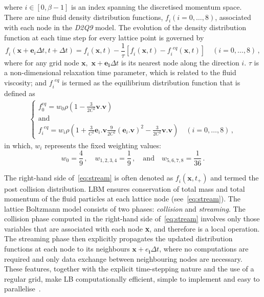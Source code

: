 %
\noindent where $\mathit{i} \in [0, \beta -1]$ is an index spanning the 
discretised momentum space. There are nine fluid density distribution 
functions, $\mathit{f_i}(\mathit{i}=0,\dots,8)$, associated with each node 
in the \textit{D2Q9} model. The evolution of the density distribution function 
at each time step for every lattice point is governed by
%
\begin{equation} 
	\label{eq:stream}
	\mathit{f_i}(\mathbf{x}+\mathbf{e}_{\mathit{i}} \Delta t, t + \Delta t) = 
	\mathit{f_i}(\mathbf{x},t) - \frac{1}{\tau} [\mathit{f_i}(\mathbf{x},t) 
	-\mathit{f_i}^{\mathit{eq}}(\mathbf{x},t)] \quad (\mathit{i}=0,\dots,8) \,,
\end{equation}
%
\noindent where for any grid node $\mathbf{x},$ $\mathbf{x}+\mathbf{e_i} \Delta 
t$ 
is its nearest node along the direction $\mathit{i}$. $\tau$ is a 
non-dimensional relaxation time parameter, which is related to the fluid 
viscosity; and $\mathit{f_i}^{\mathit{eq}}$ is termed as the equilibrium 
distribution function that is defined as
%
\begin{align}
	\begin{cases}
	\mathit{f}_{\mathit{0}}^{\mathit{eq}} = \mathit{w}_{\mathit{0}} \rho (1 - 
	\frac{3}{2\mathit{C}^{\mathit{2}}}\mathbf{v}.\mathbf{v}) \\ 
	\mbox{and}\\
	\mathit{f_i}^{\mathit{eq}} = \mathit{w_i} \rho (1 + 
	\frac{3}{\mathit{C}^{\mathit{2}}}\mathbf{e}_{\mathit{i}}.\mathbf{v} 
	\frac{9}{2\mathit{C}^{\mathit{2}}} 
	(\mathbf{e}_{\mathit{i}}.\mathbf{v})^{\mathit{2}}-\frac{3}{2 
	\mathit{C}^{\mathit{2}}}\mathbf{v}.\mathbf{v}) \quad 
	(\mathit{i}=0,\dots,8)\,,
	\end{cases}
\end{align}
%
\noindent in which, $\mathit{w_i}$ represents the fixed weighting values:
%
\begin{equation}
	\mathit{w}_{\mathit{0}} = \frac{4}{9}\,, \quad 
	\mathit{w}_{\mathit{1,2,3,4}}= 
	\frac{1}{9}\,, \quad \mbox{and} \quad \mathit{w}_{\mathit{5,6,7,8}}= 
	\frac{1}{36}\,.
\end{equation}

The right-hand side of~\cref{eq:stream} is often denoted as 
$\mathit{f_i}(\mathbf{x}, \mathit{t}_{+})$ and termed the post collision 
distribution. LBM ensures conservation of total mass and total momentum of the 
fluid particles at each lattice node (see~\cref{eq:stream}). The lattice 
Boltzmann model consists of two phases: \textit{collision} and 
\textit{streaming}. The 
collision phase computed in the right-hand side of~\cref{eq:stream} involves 
only those variables that are associated with each node \textbf{x}, and 
therefore is a local operation. The streaming phase then explicitly propagates 
the updated distribution functions at each node to its neighbours 
$\mathbf{x}+\mathbf{\mathit{e}_i} \Delta t$, where no computations are required 
and only data exchange between neighbouring nodes are necessary. These 
features, together with the explicit time-stepping nature and the use of a 
regular grid, make LB computationally efficient, simple to implement and 
easy to parallelise~\citep{Han2007a}. 

